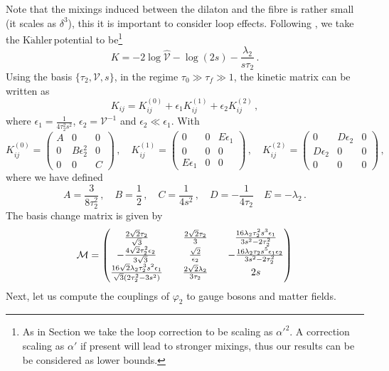 \documentclass[11pt,a4paper]{article}
\newcommand{\V}{\mathcal{V}}
\newcommand{\Kahler}{\ensuremath{\text{K}\ddot{\text{a}}\text{hler}\,}}
\begin{document}
%
Note that the mixings induced between the dilaton and the fibre is rather small (it scales as $\delta^{3}$), this it is important to consider loop effects. Following \cite{Berg:2005ja, Conlon:2006gv, Berg:2007wt, Cicoli:2007xp, Cicoli:2008va}, we take the \Kahler potential to be\footnote{As in Section \label{sec:SMSing} we take the loop correction to be scaling as $\alpha'^{2}$. A correction scaling as $\alpha'$ if present will lead to stronger mixings, thus our results can be be considered as lower bounds.} 
%
\begin{equation}
K = - 2 \log \hat{\V} - \log\left(2s\right) - \frac{\lambda_2}{s \tau_2} \,.
\end{equation}
%
 Using the basis $\{\tau_2, \V, s\}$, in the regime $\tau_0 \gg \tau_f \gg 1$, the kinetic matrix can be written as
%
\begin{equation}
K_{ij} = K^{(0)}_{ij} + \epsilon_1 K^{(1)}_{ij} + \epsilon_2 K^{(2)}_{ij} \,,
\end{equation}
%
where $\epsilon_1 = \frac{1}{4 \tau_2^2 s^2}$, $\epsilon_2 = \V^{-1}$ and $\epsilon_2 \ll \epsilon_1$. With
\begin{equation}
K^{(0)}_{ij} = \begin{pmatrix}
A & 0 & 0 \\
0 & B \epsilon_2^2 & 0  \\
0 & 0 & C
\end{pmatrix} \,, \quad
K^{(1)}_{ij} = \begin{pmatrix}
0 & 0 & E \epsilon_1 \\
0 & 0 & 0  \\
E \epsilon_1 & 0 & 0
\end{pmatrix} \,, \quad
K^{(2)}_{ij} = \begin{pmatrix}
0 & D \epsilon_2 & 0 \\
D \epsilon_2 & 0 & 0 \\
0 & 0 & 0
\end{pmatrix} \,,
\end{equation}
where we have defined
\begin{equation}
A = \frac{3}{8 \tau_2^2} \,, \quad B = \frac{1}{2} \,, \quad C = \frac{1}{4 s^2} \,, \quad D = -\frac{1}{4 \tau_2} \quad E = -\lambda_2 \,.
\end{equation}
%
The basis change matrix is given by
\begin{equation}
\label{eq:RotationFibreLoop}
{\cal M} =
\begin{pmatrix}
{2 \sqrt{2}  \tau_2 \over \sqrt{3} } &&  { 2 \sqrt{2} \tau_2 \over 3 } && {16 \lambda_2 \tau_2^2 s^3 \epsilon_1 \over {3s^2 - 2 \tau_2^2}}\\
-{ 4 \sqrt{2} \tau_2^2 \epsilon_2 \over 3 \sqrt{3} } && { \sqrt{2} \over \epsilon_2}  && - {16 \lambda_2 \tau_2 s^5 \epsilon_1 \epsilon_2 \over {3s^2 - 2 \tau_2^2}}\\
{16 \sqrt{2} \lambda_2 \tau_2^3 s^{2} \epsilon_1 \over {\sqrt{3} (2 \tau_2^2  - 3s^2)}}  && {2 \sqrt{2} \lambda_2 \over 3 \tau_2} && { 2s} \\
\end{pmatrix}
\end{equation}
%
Next, let us compute the couplings of $\varphi_2$ to gauge bosons and matter fields.
\end{document}
